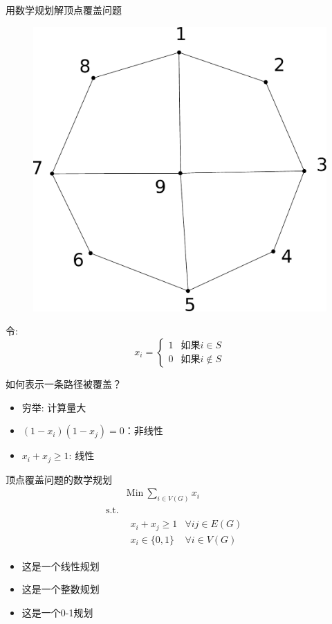 \documentclass[UTF8]{ctexbeamer}
\begin{document}
\begin{frame}{用数学规划解顶点覆盖问题}
  \begin{figure}
    \centering
    \includegraphics[width=.4\textwidth]{city.pdf}
  \end{figure}

  令:
  \[
  x_i =\left\{
  \begin{array}{cc}
    1 & \text{如果} i \in S\\
    0 & \text{如果} i \notin S
  \end{array}
  \right.
  \]
\end{frame}

\begin{frame}{如何表示一条路径被覆盖？}
  \begin{itemize}
  \item<1-> 穷举: 计算量大
  \item<2-> $(1-x_i)(1-x_j) = 0$：非线性
  \item<3-> $x_i+x_j \ge 1$: 线性
  \end{itemize}
\end{frame}

\begin{frame}{顶点覆盖问题的数学规划}
  \[
  \begin{array}{lcl}
    & \mbox{Min}\ \sum_{i \in V(G)} x_i & \\
    \mbox{s.t.} & &  \\
    &
    \begin{array}{cc}
      x_i+x_j \ge 1 & \forall ij \in E(G)\\
      x_i \in \{0, 1\} & \forall i \in V(G)
    \end{array}
    &
  \end{array}
  \]

  \begin{itemize}
  \item 这是一个线性规划
  \item 这是一个整数规划
  \item 这是一个0-1规划
  \end{itemize}

\end{frame}
\end{document}

